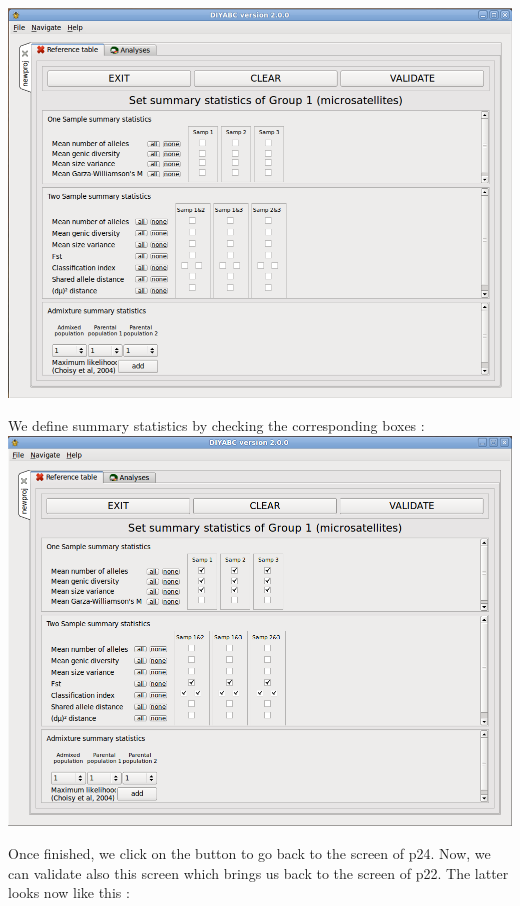 \includegraphics[scale=0.35]{gui_pictures/Capture-DIYABC-20.png} 

We define summary statistics by checking the corresponding boxes :\\ 

\includegraphics[scale=0.35]{gui_pictures/Capture-DIYABC-21.png} 

Once finished, we click on the  button to go back to the screen of p24. Now, we can validate also this screen which brings us back to the screen of p22. The latter looks now like this : \\


